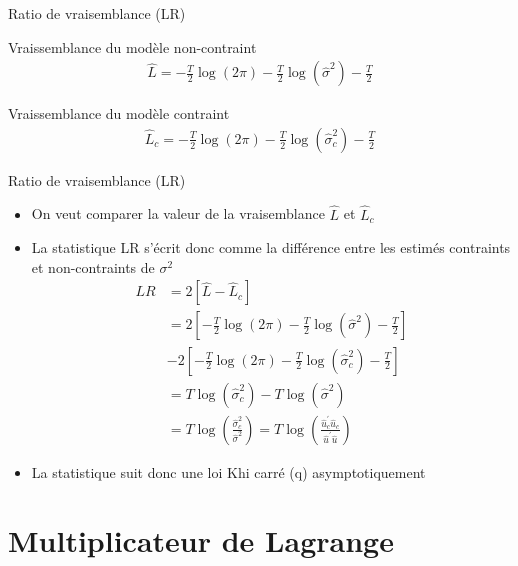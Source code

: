 \documentclass{beamer}
\begin{document}
\begin{frame}{Ratio de vraisemblance (LR)}
\begin{block}{Vraissemblance du modèle non-contraint}
\begin{align*}
\hat{L}=-\frac{T}{2} \log (2 \pi) -\frac{T}{2} \log (\hat{\sigma}^2)-\frac{T}{2} 
\end{align*}
\end{block}
\begin{block}{Vraissemblance du modèle contraint}
\begin{align*}
\hat{L}_c=-\frac{T}{2} \log (2 \pi) -\frac{T}{2} \log (\hat{\sigma}_c^2)-\frac{T}{2} 
\end{align*}
\end{block}
\end{frame}

\begin{frame}{Ratio de vraisemblance (LR)}
\begin{itemize}
\item On veut comparer la valeur de la vraisemblance $\hat{L}$ et $\hat{L}_c$
\item La statistique LR s’écrit donc comme la différence entre les estimés contraints et non-contraints de $\sigma^2$
\begin{align*}
LR & =2[\hat{L}-\hat{L}_c]\\ & =  2\left[ -\frac{T}{2} \log (2 \pi) -\frac{T}{2} \log (\hat{\sigma}^2)-\frac{T}{2}  \right]\\ & -2\left[ -\frac{T}{2} \log (2 \pi) -\frac{T}{2} \log (\hat{\sigma}_c^2)-\frac{T}{2} \right] \\ & =T \log (\hat{\sigma}_c^2)-T \log (\hat{\sigma}^2) \\ & = T \log \left( \frac{\hat{\sigma}_c^2}{\hat{\sigma}^2}\right) = T \log \left( \frac{\hat{u}_c^{'}\hat{u}_c}{\hat{u}^{'} \hat{u}}\right) 
\end{align*}
\item La statistique suit donc une loi Khi carré (q) asymptotiquement
\end{itemize}
\end{frame}

\section{Multiplicateur de Lagrange}

\frame{\tableofcontents[current]}
\end{document}
